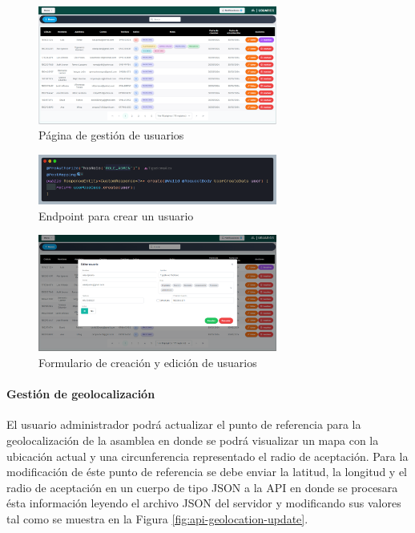 \begin{figure}[H]
    \centering
    \includegraphics[width=0.7\textwidth]{resources/images/sw-usuarios}
    \caption{Página de gestión de usuarios}
    \label{fig:sw-usuarios}
\end{figure}

\begin{figure}[H]
    \centering
    \includegraphics[width=0.7\textwidth]{resources/images/api-crotroller-create-user}
    \caption{Endpoint para crear un usuario}
    \label{fig:api-controller-create-user}
\end{figure}

\begin{figure}[H]
    \centering
    \includegraphics[width=0.7\textwidth]{resources/images/sw-usuarios-form}
    \caption{Formulario de creación y edición de usuarios}
    \label{fig:sw-create-user-form}
\end{figure}


\paragraph{Gestión de geolocalización}

El usuario administrador podrá actualizar el punto de referencia para la geolocalización de la asamblea en donde se podrá visualizar un mapa con la ubicación actual y una circunferencia representado el radio de aceptación.
Para la modificación de éste punto de referencia se debe enviar la latitud, la longitud y el radio de aceptación en un cuerpo de tipo JSON a la API en donde se procesara ésta información leyendo el archivo JSON del servidor y modificando sus valores tal como se muestra en la Figura \ref{fig:api-geolocation-update}.


